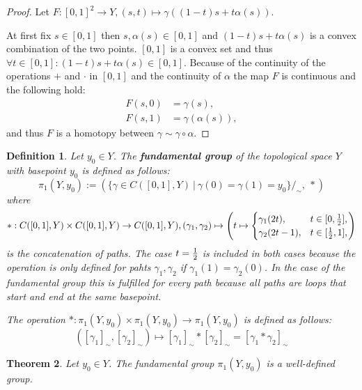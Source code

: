 \documentclass[a4paper, 11pt, twoside]{article}
\theoremstyle{break}
\newtheorem{thm}{Theorem}[section]
\theoremstyle{break}
\newtheorem{defin}[thm]{Definition}
\begin{document}
\begin{proof}
  Let $F: [0,1]^2 \to Y, (s, t) \mapsto \gamma((1 - t)s + t\alpha(s))$.

  At first fix $s \in [0,1]$ then $s, \alpha(s) \in [0,1]$ and $(1 - t)s + t\alpha(s)$ is a convex combination of the two points. 
  $[0,1]$ is a convex set and thus $\forall t\in[0,1]: (1 - t)s + t\alpha(s) \in [0,1]$. Because of the continuity of the operations $+$ and $\cdot$ in $[0,1]$ 
  and the continuity of $\alpha$ the map $F$ is continuous and the following hold:
  \begin{align*}
    F(s, 0) &= \gamma(s), \\
    F(s, 1) &= \gamma(\alpha(s)),
  \end{align*}
  and thus $F$ is a homotopy between $\gamma \sim \gamma \circ \alpha$.
\end{proof}

\begin{defin}
  Let $y_0 \in Y$. The \textbf{fundamental group} of the topological space $Y$ with basepoint $y_0$ is defined as follows:
  \begin{equation*}
    \pi_1(Y, y_0) := (\{\gamma \in C([0,1],Y) \: | \: \gamma(0) = \gamma(1) = y_0\}/_{\sim}, \: *)
  \end{equation*}
  where 
  \begin{equation*} 
    *: C([0,1], Y) \times C([0,1], Y) \to C([0,1], Y), (\gamma_1, \gamma_2) \mapsto \left(t \mapsto \begin{cases}
    \gamma_1(2t),   &t \in [0, {1 \over 2}], \\
    \gamma_2(2t-1), &t \in [{1 \over 2}, 1],
  \end{cases}\right)
\end{equation*}
is the concatenation of paths. The case $t = {1\over2}$ is included in both cases because the operation is only defined for pahts $\gamma_1, \gamma_2$ if $\gamma_1(1) = \gamma_2(0)$. 
In the case of the fundamental group this is fulfilled for every path because all paths are loops that start and end at the same basepoint.

The operation $*: \pi_1(Y, y_0) \times \pi_1(Y, y_0) \to \pi_1(Y, y_0)$ is defined as follows:
\begin{equation*}
  ([\gamma_1]_{\sim}, [\gamma_2]_{\sim}) \mapsto [\gamma_1]_{\sim} * [\gamma_2]_{\sim} = [\gamma_1 * \gamma_2]_{\sim}
\end{equation*} 
\end{defin}

\begin{thm}
  Let $y_0 \in Y$. The fundamental group $\pi_1(Y, y_0)$ is a well-defined group. 
\end{thm}
\end{document}
